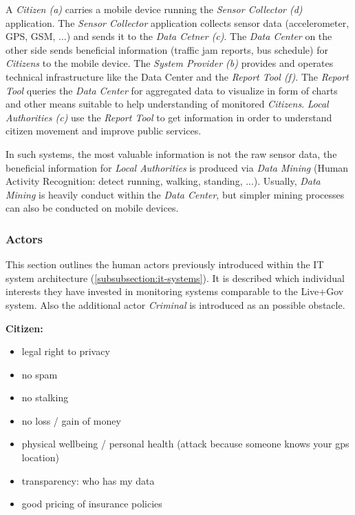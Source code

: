 

A \textit{Citizen (a)} carries a mobile device running the \textit{Sensor Collector (d)} application.
The \textit{Sensor Collector} application collects sensor data (accelerometer, GPS, GSM, ...) and sends it to the \textit{Data Cetner (c)}. 
The \textit{Data Center} on the other side sends beneficial information (traffic jam reports, bus schedule) for \textit{Citizens} to the mobile device.
The \textit{System Provider (b)} provides and operates technical infrastructure like the Data Center and the \textit{Report Tool (f)}.
The \textit{Report Tool} queries the \textit{Data Center} for aggregated data to visualize in form of charts and other means suitable to help understanding of monitored \textit{Citizens}. 
\textit{Local Authorities (c)} use the \textit{Report Tool} to get information in order to understand citizen movement and improve public services. 

In such systems, the most valuable information is not the raw sensor data, the beneficial information for \textit{Local Authorities} is produced via \textit{Data Mining} (Human Activity Recognition: detect running, walking, standing, ...). 
Usually, \textit{Data Mining} is heavily conduct within the \textit{Data Center}, but simpler mining processes can also be conducted on mobile devices.



\subsubsection{Actors}
\label{subsubsection:humans}

This section outlines the human actors previously introduced within the IT system architecture (\ref{subsubsection:it-systems}).
It is described which individual interests they have invested in monitoring systems comparable to the Live+Gov system. 
Also the additional actor \textit{Criminal} is introduced as an possible obstacle.

\textbf{Citizen:}
\begin{itemize}
\item legal right to privacy
\item no spam
\item no stalking
\item no loss / gain of money
\item physical wellbeing / personal health (attack because someone knows your gps location)
\item transparency: who has my data
\item good pricing of insurance policies
\end{itemize}

